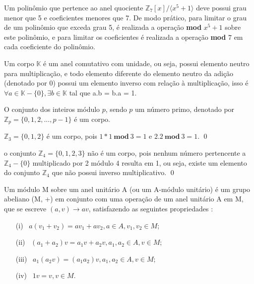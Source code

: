     Um polinômio que pertence ao anel quociente $\mathbb{Z}_7[x] / \langle x^5+1 \rangle$ deve possui grau menor que 5 e coeficientes menores que 7. De modo prático, para limitar o grau de um polinômio que exceda grau 5, é realizada a operação \textbf{mod} $x^5 + 1$ sobre este polinômio, e para limitar os coeficientes é realizada a operação \textbf{mod} $7$ em cada coeficiente do polinômio.
    
\begin{definition}[corpos]
    Um corpo $\mathbb{K}$ é um anel comutativo com unidade, ou seja, possui elemento neutro para multiplicação, e todo elemento diferente do elemento neutro da adição (denotado por 0) possui um elemento inverso com relação à multiplicação, isso é $\forall a \in \mathbb{K}-\{0\}, \exists b \in \mathbb{K}$ tal que a.b = b.a = 1.
\end{definition}

    O conjunto dos inteiros módulo $p$, sendo $p$ um número primo, denotado por $\mathbb{Z}_p = \{0,1,2,...,p-1\}$ é um corpo.
    
    \begin{exemplo}
        $\mathbb{Z}_{3} = \{0,1,2\}$ é um corpo, pois $1*1\ \textbf{mod}\ 3=1$ e $2.2\ \textbf{mod}\ 3 = 1$.
    \qed
    \end{exemplo}

    \begin{contraexemplo}
        o conjunto $\mathbb{Z}_{4} = \{0,1,2,3\}$ não é um corpo, pois nenhum número pertencente a $\mathbb{Z}_4-\{0\}$ multiplicado por 2 módulo 4 resulta em 1, ou seja, existe um elemento do conjunto $\mathbb{Z}_4$ que não possui inverso multiplicativo.
    \qed
    \end{contraexemplo}

    \begin{definition}
        Um módulo M sobre um anel unitário A (ou um A-módulo unitário) é um grupo abeliano (M, +) em conjunto com uma operação de um anel unitário A em M, que se escreve $(a, v) \rightarrow av$, satisfazendo as seguintes propriedades \cite{introducao_a_algebra}:

        \begin{enumerate}
            \item[(i)] \ $a(v_1 + v_2) = a v_1 + a v_2, a \in A, v_1 , v_2 \in M$;
            \item[(ii)] \ $(a_1 + a_2)v = a_1 v + a_2 v, a_1, a_2 \in A, v \in M$;
            \item[(iii)] \ $a_1 (a_2 v) = (a_1 a_2)v, a_1, a_2 \in A, v \in M$;
            \item[(iv)] \ $1 v = v, v \in M$.
        \end{enumerate}
    \end{definition}

